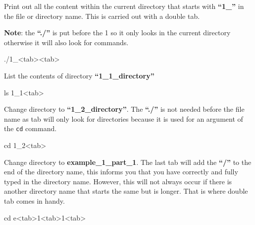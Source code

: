 \documentclass[
  letterpaper,
  DIV=11,
  numbers=noendperiod]{scrreprt}
\newenvironment{Shaded}{\begin{snugshade}}{\end{snugshade}}
\newcommand{\BuiltInTok}[1]{\textcolor[rgb]{0.00,0.23,0.31}{#1}}
\newcommand{\ExtensionTok}[1]{\textcolor[rgb]{0.00,0.23,0.31}{#1}}
\newcommand{\FunctionTok}[1]{\textcolor[rgb]{0.28,0.35,0.67}{#1}}
\newcommand{\NormalTok}[1]{\textcolor[rgb]{0.00,0.23,0.31}{#1}}
\newcommand{\OperatorTok}[1]{\textcolor[rgb]{0.37,0.37,0.37}{#1}}
\begin{document}
Print out all the content within the current directory that starts with
\textbf{``1\_''} in the file or directory name. This is carried out with
a double tab.

\textbf{Note}: the \textbf{``./''} is put before the 1 so it only looks
in the current directory otherwise it will also look for commands.

\begin{Shaded}
\begin{Highlighting}[]
\ExtensionTok{./1\_}\OperatorTok{\textless{}}\NormalTok{tab}\OperatorTok{\textgreater{}\textless{}}\NormalTok{tab}\OperatorTok{\textgreater{}}
\end{Highlighting}
\end{Shaded}

List the contents of directory \textbf{``1\_1\_directory''}

\begin{Shaded}
\begin{Highlighting}[]
\FunctionTok{ls}\NormalTok{ 1\_1}\OperatorTok{\textless{}}\NormalTok{tab}\OperatorTok{\textgreater{}}
\end{Highlighting}
\end{Shaded}

Change directory to \textbf{``1\_2\_directory''}. The \textbf{``./''} is
not needed before the file name as tab will only look for directories
because it is used for an argument of the \texttt{cd} command.

\begin{Shaded}
\begin{Highlighting}[]
\BuiltInTok{cd}\NormalTok{ 1\_2}\OperatorTok{\textless{}}\NormalTok{tab}\OperatorTok{\textgreater{}}
\end{Highlighting}
\end{Shaded}

Change directory to \textbf{example\_1\_part\_1}. The last tab will add
the \textbf{``/''} to the end of the directory name, this informs you
that you have correctly and fully typed in the directory name. However,
this will not always occur if there is another directory name that
starts the same but is longer. That is where double tab comes in handy.

\begin{Shaded}
\begin{Highlighting}[]
\BuiltInTok{cd}\NormalTok{ e}\OperatorTok{\textless{}}\NormalTok{tab}\OperatorTok{\textgreater{}}\NormalTok{1}\OperatorTok{\textless{}}\NormalTok{tab}\OperatorTok{\textgreater{}}\NormalTok{1}\OperatorTok{\textless{}}\NormalTok{tab}\OperatorTok{\textgreater{}}
\end{Highlighting}
\end{Shaded}
\end{document}
